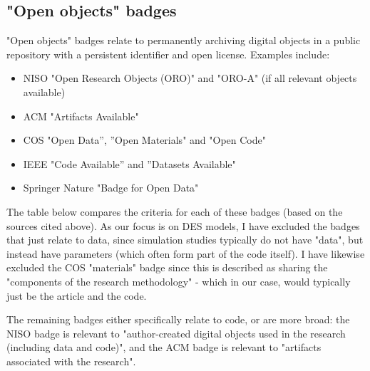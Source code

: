 \newpage
\subsection{"Open objects" badges}

"Open objects" badges relate to permanently archiving digital objects in a public repository with a persistent identifier and open license.\autocite{niso_reproducibility_badging_and_definitions_working_group_reproducibility_2021} Examples include:
\begin{itemize}
    \item NISO "Open Research Objects (ORO)" and "ORO-A" (if all relevant objects available)\autocite{niso_reproducibility_badging_and_definitions_working_group_reproducibility_2021}
    \item ACM "Artifacts Available"\autocite{association_for_computing_machinery_acm_artifact_2020}
    \item COS "Open Data”, ”Open Materials" and "Open Code"\autocite{blohowiak_badges_2023}
    \item IEEE "Code Available” and ”Datasets Available"\autocite{institute_of_electrical_and_electronics_engineers_ieee_about_nodate}
    \item Springer Nature "Badge for Open Data"\autocite{springer_nature_springer_2018}
\end{itemize}

The table below compares the criteria for each of these badges (based on the sources cited above). As our focus is on DES models, I have excluded the badges that just relate to data, since simulation studies typically do not have "data", but instead have parameters (which often form part of the code itself). I have likewise excluded the COS "materials" badge since this is described as sharing the "components of the research methodology" - which in our case, would typically just be the article and the code.

The remaining badges either specifically relate to code, or are more broad: the NISO badge is relevant to "author-created digital objects used in the research (including data and code)",\autocite{niso_reproducibility_badging_and_definitions_working_group_reproducibility_2021} and the ACM badge is relevant to "artifacts associated with the research".\autocite{association_for_computing_machinery_acm_artifact_2020}

